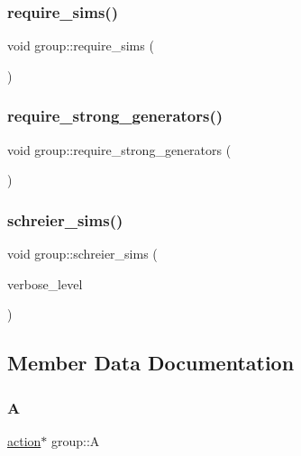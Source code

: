 \subsubsection{\texorpdfstring{require\+\_\+sims()}{require\_sims()}}
{\footnotesize\ttfamily void group\+::require\+\_\+sims (\begin{DoxyParamCaption}{ }\end{DoxyParamCaption})}

\mbox{\label{classgroup_adfc3de74ab859ba6dba668b50efaf392}} 
\subsubsection{\texorpdfstring{require\+\_\+strong\+\_\+generators()}{require\_strong\_generators()}}
{\footnotesize\ttfamily void group\+::require\+\_\+strong\+\_\+generators (\begin{DoxyParamCaption}{ }\end{DoxyParamCaption})}

\mbox{\label{classgroup_a224ed784f302897ca0c0e578446afa08}} 
\subsubsection{\texorpdfstring{schreier\+\_\+sims()}{schreier\_sims()}}
{\footnotesize\ttfamily void group\+::schreier\+\_\+sims (\begin{DoxyParamCaption}\item[{\mbox{\hyperlink{galois_8h_a09fddde158a3a20bd2dcadb609de11dc}{I\+NT}}}]{verbose\+\_\+level }\end{DoxyParamCaption})}



\subsection{Member Data Documentation}
\mbox{\label{classgroup_a056e73bdc68f2d6db4cd20191ef67959}} 
\subsubsection{\texorpdfstring{A}{A}}
{\footnotesize\ttfamily \mbox{\hyperlink{classaction}{action}}$\ast$ group\+::A}

